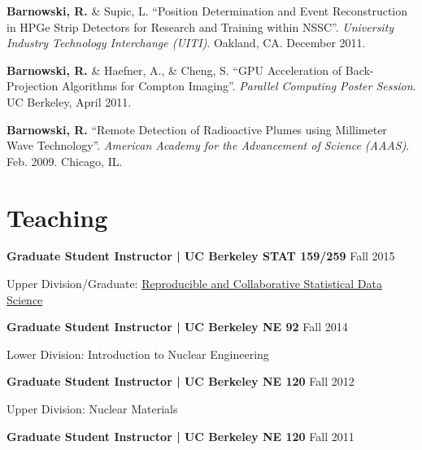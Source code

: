 \documentclass[margin,line]{res}
\newenvironment{list1}{
  \begin{list}{\ding{113}}{%
      \setlength{\itemsep}{0in}
      \setlength{\parsep}{0in} \setlength{\parskip}{0in}
      \setlength{\topsep}{0in} \setlength{\partopsep}{0in} 
      \setlength{\leftmargin}{0.17in}}}{\end{list}}
\begin{document}
\begin{resume}
{\bf Barnowski, R.} \& Supic, L. ``Position Determination and Event 
Reconstruction in HPGe Strip Detectors for Research and Training within NSSC''.
{\it University Industry Technology Interchange (UITI)}. Oakland, CA. December 
2011.

{\bf Barnowski, R.} \& Haefner, A., \& Cheng, S. ``GPU Acceleration of 
Back-Projection Algorithms for Compton Imaging''. {\it Parallel Computing
Poster Session}. UC Berkeley, April 2011.

{\bf Barnowski, R.} ``Remote Detection of Radioactive Plumes using Millimeter
Wave Technology''. {\it American Academy for the Advancement of Science (AAAS)}.
Feb. 2009. Chicago, IL.

\section{\sc Teaching\footnotemark}

{\bf Graduate Student Instructor | UC Berkeley STAT 159/259} \hfill Fall 2015 

\begin{list1}
\item[] Upper Division\footnotemark/Graduate: 
        \href{http://www.jarrodmillman.com/stat159-fall2015/}
             {Reproducible and Collaborative Statistical Data Science}
\end{list1}
{\bf Graduate Student Instructor | UC Berkeley NE 92} \hfill Fall 2014

\begin{list1}
  \item[] Lower Division: Introduction to Nuclear Engineering
\end{list1}
{\bf Graduate Student Instructor | UC Berkeley NE 120} \hfill Fall 2012

\begin{list1}
  \item[] Upper Division: Nuclear Materials
\end{list1}
{\bf Graduate Student Instructor | UC Berkeley NE 120} \hfill Fall 2011


\end{resume}
\end{document}
